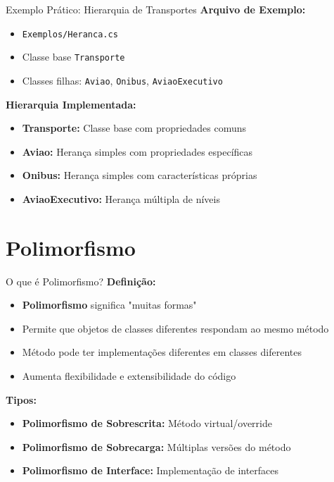 \documentclass[aspectratio=169]{beamer}
\begin{document}
\begin{frame}{Exemplo Prático: Hierarquia de Transportes}
\textbf{Arquivo de Exemplo:}
\begin{itemize}
    \item \texttt{Exemplos/Heranca.cs}
    \item Classe base \texttt{Transporte}
    \item Classes filhas: \texttt{Aviao}, \texttt{Onibus}, \texttt{AviaoExecutivo}
\end{itemize}

\textbf{Hierarquia Implementada:}
\begin{itemize}
    \item \textbf{Transporte:} Classe base com propriedades comuns
    \item \textbf{Aviao:} Herança simples com propriedades específicas
    \item \textbf{Onibus:} Herança simples com características próprias
    \item \textbf{AviaoExecutivo:} Herança múltipla de níveis
\end{itemize}
\end{frame}

\section{Polimorfismo}

\begin{frame}{O que é Polimorfismo?}
\textbf{Definição:}
\begin{itemize}
    \item \textbf{Polimorfismo} significa "muitas formas"
    \item Permite que objetos de classes diferentes respondam ao mesmo método
    \item Método pode ter implementações diferentes em classes diferentes
    \item Aumenta flexibilidade e extensibilidade do código
\end{itemize}

\textbf{Tipos:}
\begin{itemize}
    \item \textbf{Polimorfismo de Sobrescrita:} Método virtual/override
    \item \textbf{Polimorfismo de Sobrecarga:} Múltiplas versões do método
    \item \textbf{Polimorfismo de Interface:} Implementação de interfaces
\end{itemize}
\end{frame}
\end{document}
